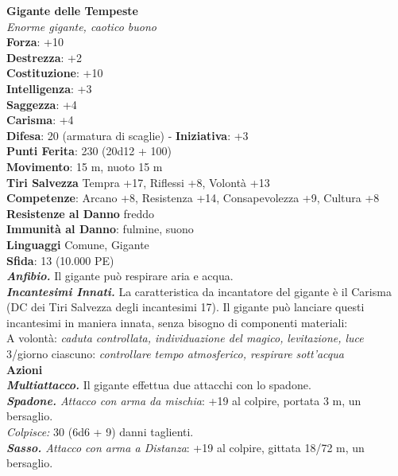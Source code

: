 \begin{multicols}{2}
\medskip\textbf{Gigante delle Tempeste}\\
\emph{Enorme gigante, caotico buono}\\
\textbf{Forza}: +10\\
\textbf{Destrezza}: +2\\
\textbf{Costituzione}: +10\\
\textbf{Intelligenza}: +3\\
\textbf{Saggezza}: +4\\
\textbf{Carisma}: +4\\
\textbf{Difesa}: 20 (armatura di scaglie) - \textbf{Iniziativa}: +3\\
\textbf{Punti Ferita}: 230 (20d12 + 100)\\
\textbf{Movimento}: 15 m, nuoto 15 m\\
\textbf{Tiri Salvezza} Tempra +17, Riflessi +8, Volontà +13\\
\textbf{Competenze}: Arcano +8, Resistenza +14, Consapevolezza +9, Cultura +8\\
\textbf{Resistenze al Danno} freddo\\
\textbf{Immunità al Danno}: fulmine, suono\\
\textbf{Linguaggi} Comune, Gigante\\
\textbf{Sfida}: 13 (10.000 PE)\smallskip\\
\emph{\textbf{Anfibio.}} Il gigante può respirare aria e acqua.\\
\emph{\textbf{Incantesimi Innati.}} La caratteristica da incantatore del gigante è il Carisma (DC dei Tiri Salvezza degli incantesimi 17). Il gigante può lanciare questi incantesimi in maniera innata, senza bisogno di componenti materiali:\\
A volontà: \emph{caduta controllata, individuazione del magico,} \emph{levitazione, luce}\\
3/giorno ciascuno: \emph{controllare tempo atmosferico, respirare} \emph{sott'acqua}\\
\smallskip\textbf{Azioni}\\
\emph{\textbf{Multiattacco.}} Il gigante effettua due attacchi con lo spadone.\\
\emph{\textbf{Spadone.} Attacco con arma da mischia}: +19 al colpire, portata 3 m, un bersaglio.\\
\emph{Colpisce:} 30 (6d6 + 9) danni taglienti.\\
\emph{\textbf{Sasso.} Attacco con arma a Distanza}: +19 al colpire, gittata 18/72 m, un bersaglio.\\

\end{multicols}
